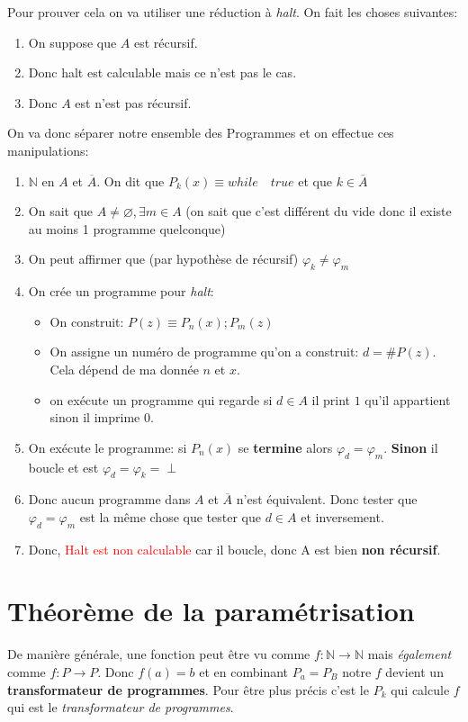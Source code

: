 \documentclass{report}
\begin{document}
Pour prouver cela on va utiliser une réduction à \textit{halt}. On fait les choses suivantes:
\begin{enumerate}
\item On suppose que $A$ est récursif.
\item Donc halt est calculable mais ce n'est pas le cas.
\item Donc $A$ est n'est pas récursif.
\end{enumerate}
On va donc séparer notre ensemble des Programmes et on effectue ces manipulations:
\begin{enumerate}
\item $\mathbb{N}$ en $A$ et $\overline{A}$. On dit que $P_k(x) \equiv while \quad true$ et que $k \in \overline{A}$
\item On sait que $A \neq \varnothing, \exists m \in A$ (on sait que c'est différent du vide donc il existe au moins 1 programme quelconque)
\item On peut affirmer que (par hypothèse de récursif) $\varphi_k \neq \varphi_m$
\item On crée un programme pour \textit{halt}:
	\begin{itemize}
	\item On construit: $P(z) \equiv P_n(x); P_m(z)$
	\item On assigne un numéro de programme qu'on a construit: $d = \#P(z)$. Cela dépend de ma donnée $n$ et $x$.
	\item on exécute un programme qui regarde si $d \in A$ il print $1$ qu'il appartient sinon il imprime $0$.
	\end{itemize}
\item On exécute le programme: si $P_n(x)$ se \textbf{termine} alors $\varphi_d = \varphi_m$. \textbf{Sinon} il boucle et est $\varphi_d = \varphi_k = \perp$
\item Donc aucun programme dans $A$ et $\overline{A}$ n'est équivalent. Donc tester que $\varphi_d = \varphi_m$ est la même chose que tester que $d \in A$ et inversement.
\item Donc, \textcolor{red}{Halt est non calculable} car il boucle, donc A est bien \textbf{non récursif}.
\end{enumerate} 


\section{Théorème de la paramétrisation}
De manière générale, une fonction peut être vu comme $f: \mathbb{N} \rightarrow \mathbb{N}$ mais \textit{également} comme $f: P \rightarrow P$. Donc $f(a) = b$ et en combinant $P_a = P_B$ notre $f$ devient un \textbf{transformateur de programmes}. Pour être plus précis c'est le $P_k$ qui calcule $f$ qui est le \textit{transformateur de programmes}.
\end{document}
